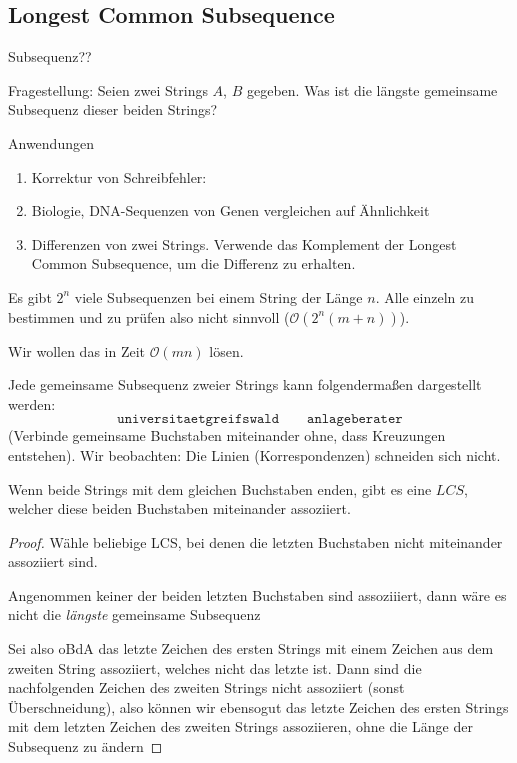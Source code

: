 \documentclass[11pt]{scrartcl}
\renewcommand{\O}{\mathcal{O}}
\begin{document}
\subsection{Longest Common Subsequence}

\begin{df}[Subsequenz]
	Subsequenz??
\end{df}

\begin{seg}{Fragestellung:}
	Seien zwei Strings $A$, $B$ gegeben.
	Was ist die längste gemeinsame Subsequenz dieser beiden Strings?
\end{seg}

\begin{seg}{Anwendungen}
	\begin{enumerate}
		\item
			Korrektur von Schreibfehler:
		\item
			Biologie, DNA-Sequenzen von Genen vergleichen auf Ähnlichkeit
		\item
			Differenzen von zwei Strings.
			Verwende das Komplement der Longest Common Subsequence, um die Differenz zu erhalten.
	\end{enumerate}
\end{seg}

Es gibt $2^n$ viele Subsequenzen bei einem String der Länge $n$.
Alle einzeln zu bestimmen und zu prüfen also nicht sinnvoll ($\O(2^n(m+n))$).

Wir wollen das in Zeit $\O(mn)$ lösen.

Jede gemeinsame Subsequenz zweier Strings kann folgendermaßen dargestellt werden:
\[
	\texttt{universitaetgreifswald} \qquad \texttt{anlageberater}
\]
(Verbinde gemeinsame Buchstaben miteinander ohne, dass Kreuzungen entstehen).
Wir beobachten: Die Linien (Korrespondenzen) schneiden sich nicht.

\begin{st}
	Wenn beide Strings mit dem gleichen Buchstaben enden, gibt es eine $LCS$, welcher diese beiden Buchstaben miteinander assoziiert.
	\begin{proof}
		Wähle beliebige LCS, bei denen die letzten Buchstaben nicht miteinander assoziiert sind.

		Angenommen keiner der beiden letzten Buchstaben sind assoziiiert, dann wäre es nicht die \emph{längste} gemeinsame Subsequenz

		Sei also oBdA das letzte Zeichen des ersten Strings mit einem Zeichen aus dem zweiten String assoziiert, welches nicht das letzte ist.
		Dann sind die nachfolgenden Zeichen des zweiten Strings nicht assoziiert (sonst Überschneidung), also können wir ebensogut das letzte Zeichen des ersten Strings mit dem letzten Zeichen des zweiten Strings assoziieren, ohne die Länge der Subsequenz zu ändern
	\end{proof}
\end{st}
\end{document}
